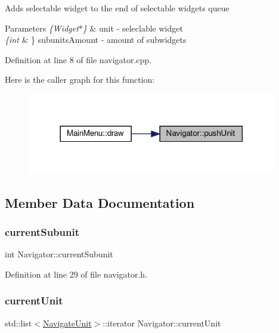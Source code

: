 Adds selectable widget to the end of selectable widgets queue 
\begin{DoxyParams}{Parameters}
{\em \{\+Widget$\ast$\}} & unit -\/ seleclable widget \\
\hline
{\em \{int} & \} subunits\+Amount -\/ amount of subwidgets \\
\hline
\end{DoxyParams}


Definition at line 8 of file navigator.\+cpp.

Here is the caller graph for this function\+:
\nopagebreak
\begin{figure}[H]
\begin{center}
\leavevmode
\includegraphics[width=309pt]{class_navigator_a47967fc9bdfd276c98f8ed1c44d5dc46_icgraph}
\end{center}
\end{figure}


\subsection{Member Data Documentation}
\mbox{\label{class_navigator_a616e5c7457f641e3027f68103e0da245}} 
\subsubsection{\texorpdfstring{currentSubunit}{currentSubunit}}
{\footnotesize\ttfamily int Navigator\+::current\+Subunit\hspace{0.3cm}{\ttfamily [private]}}



Definition at line 29 of file navigator.\+h.

\mbox{\label{class_navigator_a64d901b59121319cb87ca450dcc25912}} 
\subsubsection{\texorpdfstring{currentUnit}{currentUnit}}
{\footnotesize\ttfamily std\+::list$<$\mbox{\hyperlink{struct_navigate_unit}{Navigate\+Unit}}$>$\+::iterator Navigator\+::current\+Unit\hspace{0.3cm}{\ttfamily [private]}}




